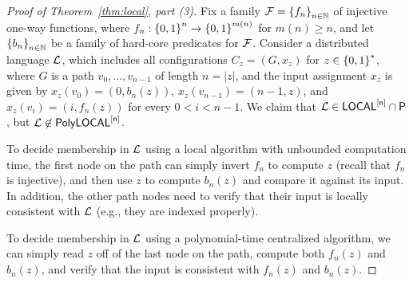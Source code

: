 \begin{proof}[Proof of Theorem~\ref{thm:local}, part (3)]
	Fix a family $\mathcal{F} = \left \{{ f_n } \right \}_{n \in \mathbb{N}}$ of injective one-way functions,
	where $f_n : \left \{{0,1} \right \}^n \rightarrow \left \{{0,1} \right \}^{m(n)}$ for $m(n) \geq n$,
	and let $\left \{{ b_n } \right \}_{n \in \mathbb{N}}$ be a family of hard-core predicates for $\mathcal{F}$.
	Consider a distributed language $\mathcal{L}$, which includes all configurations $C_z = (G, x_z)$ for $z \in \left \{{0,1} \right \}^{\ast}$,
	where $G$ is a path $v_0,\ldots,v_{n-1}$ of length $n = |z|$,
	and the input assignment $x_z$ is given by
	$x_z(v_0) = (0, b_n(z))$,
	$x_z(v_{n-1}) = (n-1, z)$,
	and $x_z(v_i) = (i, f_n(z))$ for every $0 < i < n-1$.
	We claim that $\mathcal{L} \in {\mathsf{LOCAL}}^{[\mathsf{n}]} \cap {\mathsf{P}}$, but $\mathcal{L} \not \in \mathsf{PolyLOCAL}^{[\mathsf{n}]}$.

	To decide membership in $\mathcal{L}$ using a local algorithm with unbounded computation time,
	the first node on the path can simply invert $f_n$ to compute $z$ (recall that $f_n$
	is injective),
	and then use $z$ to compute $b_n(z)$ and compare it against
	its input. In addition, the other path nodes
	need to verify that their input is locally consistent with $\mathcal{L}$
	(e.g., they are indexed properly).

	To decide membership in $\mathcal{L}$ using a polynomial-time centralized algorithm,
	we can simply read $z$ off of the last node on the path, compute both $f_n(z)$ and $b_n(z)$,
	and verify that the input is consistent with $f_n(z)$ and $b_n(z)$.



\end{proof}
